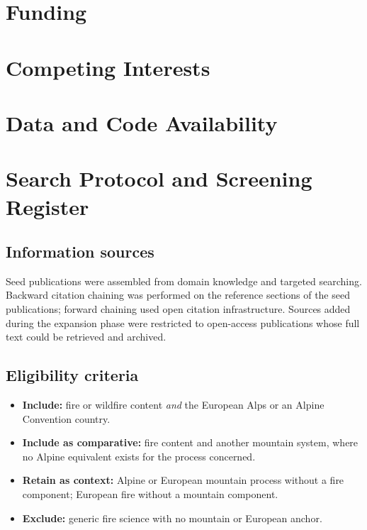 \documentclass[11pt,a4paper]{article}
\begin{document}
\section*{Funding}

\section*{Competing Interests}

\section*{Data and Code Availability}


\appendix

\section{Search Protocol and Screening Register}
\label{app:prisma}

\subsection{Information sources}

Seed publications were assembled from domain knowledge and targeted searching. Backward citation chaining was performed on the reference sections of the seed publications; forward chaining used open citation infrastructure. Sources added during the expansion phase were restricted to open-access publications whose full text could be retrieved and archived.

\subsection{Eligibility criteria}

\begin{itemize}
    \item \textbf{Include:} fire or wildfire content \emph{and} the European Alps or an Alpine Convention country.
    \item \textbf{Include as comparative:} fire content and another mountain system, where no Alpine equivalent exists for the process concerned.
    \item \textbf{Retain as context:} Alpine or European mountain process without a fire component; European fire without a mountain component.
    \item \textbf{Exclude:} generic fire science with no mountain or European anchor.
\end{itemize}
\end{document}
